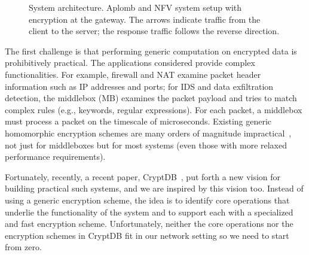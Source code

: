 \begin{figure}[t!]
\centering
{}
%
\hfill  
{}
     
\caption{System architecture. Aplomb and NFV system setup with \sys encryption  at the gateway. The arrows indicate traffic from the client to the server; the response traffic follows the reverse direction. \label{fig:sys-overview}}
\end{figure}


    
The first challenge is that performing generic computation on encrypted data is prohibitively practical. The applications considered provide complex functionalities. For example, firewall and NAT examine packet header information such as IP addresses and ports; for IDS and data exfiltration detection, the middlebox (MB) examines the packet payload and tries to match complex rules (e.g., keywords, regular expressions). For each packet, a middlebox must process a packet on the timescale of microseconds. Existing generic homomorphic encryption schemes are many orders of magnitude impractical~\cite{gentry:fhe-aes-eprint}, not just for middleboxes but for most systems (even those with more relaxed performance requirements).

Fortunately, recently, a recent paper, CryptDB~\cite{popa:cryptdb}, put forth a new vision for building practical such systems, and we are inspired by this vision too. Instead of using a generic encryption scheme, the idea is to identify core operations that underlie the functionality of the system and to support each with a specialized and fast encryption scheme. Unfortunately, neither the core operations nor the encryption schemes in CryptDB fit in our network setting so we need to start from zero.

